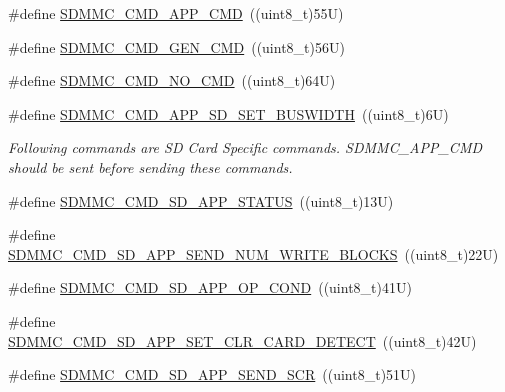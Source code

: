 \begin{DoxyCompactItemize}
\item 
\#define \mbox{\hyperlink{group___s_d_m_m_c___l_l___exported___constants_ga217e64fbb636f7ad13e3c0bb29c028d2}{S\+D\+M\+M\+C\+\_\+\+C\+M\+D\+\_\+\+A\+P\+P\+\_\+\+C\+MD}}~((uint8\+\_\+t)55\+U)
\item 
\#define \mbox{\hyperlink{group___s_d_m_m_c___l_l___exported___constants_ga8263af58c35ddc29f313b1008927687a}{S\+D\+M\+M\+C\+\_\+\+C\+M\+D\+\_\+\+G\+E\+N\+\_\+\+C\+MD}}~((uint8\+\_\+t)56\+U)
\item 
\#define \mbox{\hyperlink{group___s_d_m_m_c___l_l___exported___constants_gacfa42cc86f1ea3780eb05630132d7f2c}{S\+D\+M\+M\+C\+\_\+\+C\+M\+D\+\_\+\+N\+O\+\_\+\+C\+MD}}~((uint8\+\_\+t)64\+U)
\item 
\#define \mbox{\hyperlink{group___s_d_m_m_c___l_l___exported___constants_ga8cfe5dc1ac1f27c23326aeaf3f1bc7f6}{S\+D\+M\+M\+C\+\_\+\+C\+M\+D\+\_\+\+A\+P\+P\+\_\+\+S\+D\+\_\+\+S\+E\+T\+\_\+\+B\+U\+S\+W\+I\+D\+TH}}~((uint8\+\_\+t)6\+U)
\begin{DoxyCompactList}\small\item\em Following commands are SD Card Specific commands. S\+D\+M\+M\+C\+\_\+\+A\+P\+P\+\_\+\+C\+MD should be sent before sending these commands. \end{DoxyCompactList}\item 
\#define \mbox{\hyperlink{group___s_d_m_m_c___l_l___exported___constants_ga72b91852e20d600297c4aff320c94765}{S\+D\+M\+M\+C\+\_\+\+C\+M\+D\+\_\+\+S\+D\+\_\+\+A\+P\+P\+\_\+\+S\+T\+A\+T\+US}}~((uint8\+\_\+t)13\+U)
\item 
\#define \mbox{\hyperlink{group___s_d_m_m_c___l_l___exported___constants_gad6adafe894063d4bca807bdeb431788c}{S\+D\+M\+M\+C\+\_\+\+C\+M\+D\+\_\+\+S\+D\+\_\+\+A\+P\+P\+\_\+\+S\+E\+N\+D\+\_\+\+N\+U\+M\+\_\+\+W\+R\+I\+T\+E\+\_\+\+B\+L\+O\+C\+KS}}~((uint8\+\_\+t)22\+U)
\item 
\#define \mbox{\hyperlink{group___s_d_m_m_c___l_l___exported___constants_ga64bb2884d350d582020a84ab3bedf322}{S\+D\+M\+M\+C\+\_\+\+C\+M\+D\+\_\+\+S\+D\+\_\+\+A\+P\+P\+\_\+\+O\+P\+\_\+\+C\+O\+ND}}~((uint8\+\_\+t)41\+U)
\item 
\#define \mbox{\hyperlink{group___s_d_m_m_c___l_l___exported___constants_ga7b71cd8c7418b00ed4c643f8904b2530}{S\+D\+M\+M\+C\+\_\+\+C\+M\+D\+\_\+\+S\+D\+\_\+\+A\+P\+P\+\_\+\+S\+E\+T\+\_\+\+C\+L\+R\+\_\+\+C\+A\+R\+D\+\_\+\+D\+E\+T\+E\+CT}}~((uint8\+\_\+t)42\+U)
\item 
\#define \mbox{\hyperlink{group___s_d_m_m_c___l_l___exported___constants_gaa9f096874b5e2a593d96b6c47a7a1d78}{S\+D\+M\+M\+C\+\_\+\+C\+M\+D\+\_\+\+S\+D\+\_\+\+A\+P\+P\+\_\+\+S\+E\+N\+D\+\_\+\+S\+CR}}~((uint8\+\_\+t)51\+U)

\end{DoxyCompactItemize}
